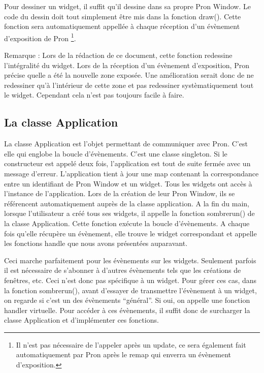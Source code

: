 Pour dessiner un widget, il suffit qu'il dessine dans sa propre Pron Window.
Le code du dessin doit tout simplement être mis dans la fonction draw().
Cette fonction sera automatiquement appellée à chaque réception d'un évènement d'exposition de Pron
\footnote{Il n'est pas nécessaire de l'appeler après un update, ce sera également fait automatiquement par Pron après le remap qui enverra un évènement d'exposition.}.

Remarque : Lors de la rédaction de ce document, cette fonction redessine l'intégralité du widget.
Lors de la réception d'un évènement d'exposition, Pron précise quelle a été la nouvelle zone exposée.
Une amélioration serait donc de ne redessiner qu'à l'intérieur de cette zone et pas redessiner systèmatiquement tout le widget.
Cependant cela n'est pas toujours facile à faire.

\subsection{La classe Application}

La classe Application est l'objet permettant de communiquer avec Pron.
C'est elle qui englobe la boucle d'évènements.
C'est une classe singleton.
Si le constructeur est appelé deux fois, l'application est tout de suite fermée avec un message d'erreur.
L'application tient à jour une map contenant la correspondance entre un identifiant de Pron Window et un widget.
Tous les widgets ont accès à l'instance de l'application.
Lors de la création de leur Pron Window, ils se référencent automatiquement auprès de la classe application.
A la fin du main, lorsque l'utilisateur a créé tous ses widgets, il appelle la fonction sombrerun() de la classe Application.
Cette fonction exécute la boucle d'évènements.
A chaque fois qu'elle récupère un évènement, elle trouve le widget correspondant et appelle les fonctions handle que nous avons présentées auparavant.

Ceci marche parfaitement pour les évènements sur les widgets.
Seulement parfois il est nécessaire de s'abonner à d'autres évènements tels que les créations de fenêtres, etc.
Ceci n'est donc pas spécifique à un widget.
Pour gérer ces cas, dans la fonction sombrerun(), avant d'essayer de transmettre l'évènement à un widget, on regarde si c'est un des évènements ``général''.
Si oui, on appelle une fonction handler virtuelle.
Pour accéder à ces évènements, il suffit donc de surcharger la classe Application et d'implémenter ces fonctions.



